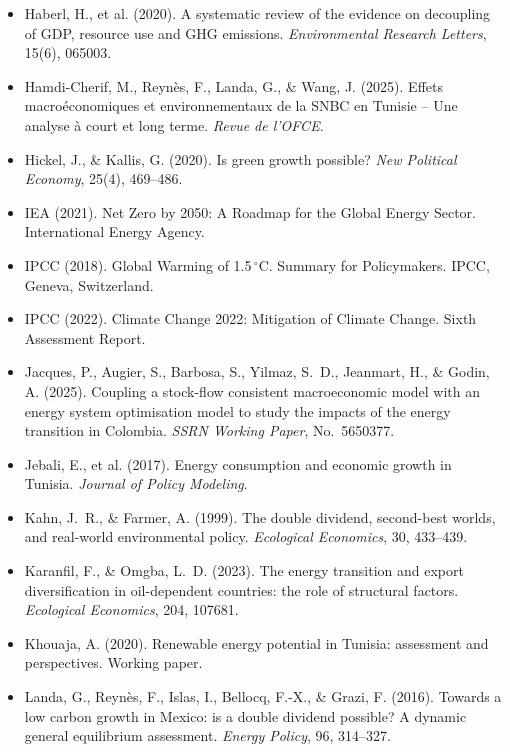 \documentclass[12pt, a4paper]{article}
\begin{document}
\begin{itemize}[label={}, leftmargin=2em, itemindent=-2em, itemsep=2pt]
\item Haberl, H., et al. (2020). A systematic review of the evidence on decoupling of GDP, resource use and GHG emissions. \textit{Environmental Research Letters}, 15(6), 065003.

\item Hamdi-Cherif, M., Reynès, F., Landa, G., \& Wang, J. (2025). Effets macroéconomiques et environnementaux de la SNBC en Tunisie -- Une analyse à court et long terme. \textit{Revue de l'OFCE}.

\item Hickel, J., \& Kallis, G. (2020). Is green growth possible? \textit{New Political Economy}, 25(4), 469--486.

\item IEA (2021). Net Zero by 2050: A Roadmap for the Global Energy Sector. International Energy Agency.

\item IPCC (2018). Global Warming of 1.5\,$^{\circ}$C. Summary for Policymakers. IPCC, Geneva, Switzerland.

\item IPCC (2022). Climate Change 2022: Mitigation of Climate Change. Sixth Assessment Report.

\item Jacques, P., Augier, S., Barbosa, S., Yilmaz, S.~D., Jeanmart, H., \& Godin, A. (2025). Coupling a stock-flow consistent macroeconomic model with an energy system optimisation model to study the impacts of the energy transition in Colombia. \textit{SSRN Working Paper}, No.~5650377.

\item Jebali, E., et al. (2017). Energy consumption and economic growth in Tunisia. \textit{Journal of Policy Modeling}.

\item Kahn, J.~R., \& Farmer, A. (1999). The double dividend, second-best worlds, and real-world environmental policy. \textit{Ecological Economics}, 30, 433--439.

\item Karanfil, F., \& Omgba, L.~D. (2023). The energy transition and export diversification in oil-dependent countries: the role of structural factors. \textit{Ecological Economics}, 204, 107681.

\item Khouaja, A. (2020). Renewable energy potential in Tunisia: assessment and perspectives. Working paper.

\item Landa, G., Reynès, F., Islas, I., Bellocq, F.-X., \& Grazi, F. (2016). Towards a low carbon growth in Mexico: is a double dividend possible? A dynamic general equilibrium assessment. \textit{Energy Policy}, 96, 314--327.


\end{itemize}
\end{document}
